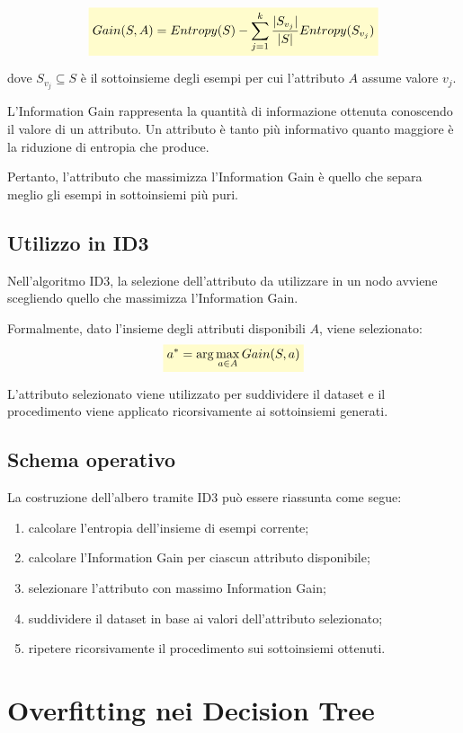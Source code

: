 \documentclass[a4paper,12pt]{report}
\newcommand{\highlight}[1]{%
\colorbox{yellow!20}{$\displaystyle #1$}%
}
\begin{document}
\[
\highlight{
Gain(S, A) =
Entropy(S)
-
\sum_{j=1}^{k}
\frac{|S_{v_j}|}{|S|}
Entropy(S_{v_j}) }
\] 

dove \( S_{v_j} \subseteq S \) è il sottoinsieme degli esempi per cui l’attributo \( A \) assume valore \( v_j \).

L’Information Gain rappresenta la quantità di informazione ottenuta conoscendo il valore di un attributo.
Un attributo è tanto più informativo quanto maggiore è la riduzione di entropia che produce.

Pertanto, l’attributo che massimizza l’Information Gain è quello che separa meglio gli esempi in sottoinsiemi più puri.

\subsection*{Utilizzo in ID3}

Nell’algoritmo ID3, la selezione dell’attributo da utilizzare in un nodo avviene scegliendo quello che massimizza l’Information Gain.

Formalmente, dato l’insieme degli attributi disponibili \( A \), viene selezionato:
\[
\highlight{
a^* = \arg\max_{a \in A} Gain(S, a) }
\]

L’attributo selezionato viene utilizzato per suddividere il dataset e il procedimento viene applicato ricorsivamente ai sottoinsiemi generati.

\subsection{Schema operativo}

La costruzione dell’albero tramite ID3 può essere riassunta come segue:
\begin{enumerate}
    \item calcolare l’entropia dell’insieme di esempi corrente;
    \item calcolare l’Information Gain per ciascun attributo disponibile;
    \item selezionare l’attributo con massimo Information Gain;
    \item suddividere il dataset in base ai valori dell’attributo selezionato;
    \item ripetere ricorsivamente il procedimento sui sottoinsiemi ottenuti.
\end{enumerate}

\section{Overfitting nei Decision Tree}
\end{document}
